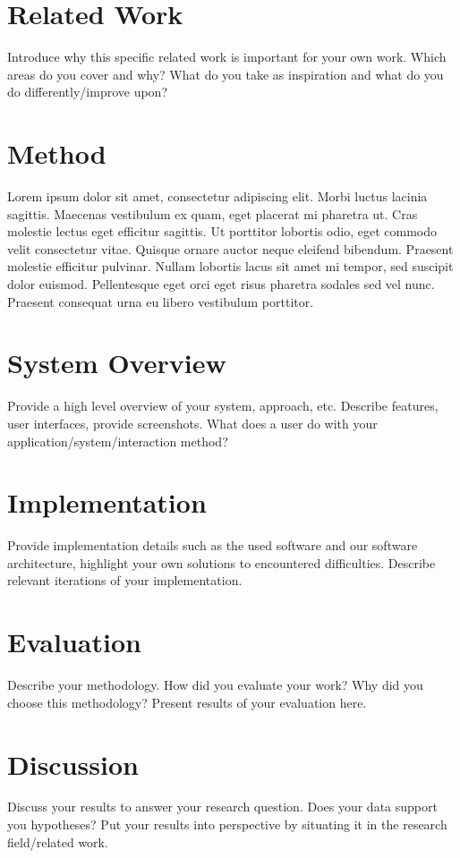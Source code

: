 \section{Related Work}
Introduce why this specific related work is important for your own work. Which areas do you cover and why? What do you take as inspiration and what do you do differently/improve upon? 

\section{Method}
Lorem ipsum dolor sit amet, consectetur adipiscing elit. Morbi luctus lacinia sagittis. Maecenas vestibulum ex quam, eget placerat mi pharetra ut. Cras molestie lectus eget efficitur sagittis. Ut porttitor lobortis odio, eget commodo velit consectetur vitae. Quisque ornare auctor neque eleifend bibendum. Praesent molestie efficitur pulvinar. Nullam lobortis lacus sit amet mi tempor, sed suscipit dolor euismod. Pellentesque eget orci eget risus pharetra sodales sed vel nunc. Praesent consequat urna eu libero vestibulum porttitor.

\section{System Overview}
Provide a high level overview of your system, approach, etc. 
Describe features, user interfaces, provide screenshots.
What does a user do with your application/system/interaction method?

\section{Implementation}
Provide implementation details such as the used software and our software architecture, highlight your own solutions to encountered difficulties. Describe relevant iterations of your implementation.

\section{Evaluation}
Describe your methodology. How did you evaluate your work? Why did you choose this methodology? Present results of your evaluation here.

\section{Discussion}
Discuss your results to answer your research question. Does your data support you hypotheses? Put your results into perspective by situating it in the research field/related work.

